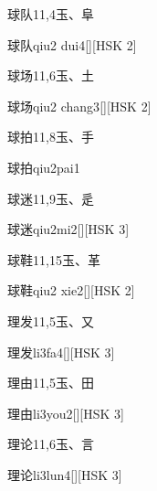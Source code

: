 \begin{entry}{球队}{11,4}{⽟、⾩}
  \begin{phonetics}{球队}{qiu2 dui4}[][HSK 2]
  \end{phonetics}
\end{entry}

\begin{entry}{球场}{11,6}{⽟、⼟}
  \begin{phonetics}{球场}{qiu2 chang3}[][HSK 2]
  \end{phonetics}
\end{entry}

\begin{entry}{球拍}{11,8}{⽟、⼿}
  \begin{phonetics}{球拍}{qiu2pai1}
  \end{phonetics}
\end{entry}

\begin{entry}{球迷}{11,9}{⽟、⾡}
  \begin{phonetics}{球迷}{qiu2mi2}[][HSK 3]
  \end{phonetics}
\end{entry}

\begin{entry}{球鞋}{11,15}{⽟、⾰}
  \begin{phonetics}{球鞋}{qiu2 xie2}[][HSK 2]
  \end{phonetics}
\end{entry}

\begin{entry}{理发}{11,5}{⽟、⼜}
  \begin{phonetics}{理发}{li3fa4}[][HSK 3]
  \end{phonetics}
\end{entry}

\begin{entry}{理由}{11,5}{⽟、⽥}
  \begin{phonetics}{理由}{li3you2}[][HSK 3]
  \end{phonetics}
\end{entry}

\begin{entry}{理论}{11,6}{⽟、⾔}
  \begin{phonetics}{理论}{li3lun4}[][HSK 3]
  \end{phonetics}
\end{entry}

